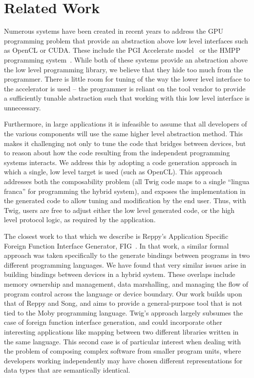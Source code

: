 
\section{Related Work}

Numerous systems have been created in recent years to address the GPU
programming problem that provide an abstraction above low level interfaces such
as OpenCL or CUDA. These include the PGI Accelerate model~\cite{pgi-accelerate}
or the HMPP programming system~\cite{hmpp}. While both of these systems provide
an abstraction above the low level programming library, we believe that they
hide too much from the programmer. There is little room for tuning of the way
the lower level interface to the accelerator is used -- the programmer is
reliant on the tool vendor to provide a sufficiently tunable abstraction such
that working with this low level interface is unnecessary.

Furthermore, in large applications it is infeasible to assume that all
developers of the various components will use the same higher level abstraction
method. This makes it challenging not only to tune the code that bridges between
devices, but to reason about how the code resulting from the independent
programming systems interacts. We address this by adopting a code generation
approach in which a single, low level target is used (such as OpenCL). This
approach addresses both the composability problem (all Twig code maps to a
single ``lingua franca'' for programming the hybrid system), and exposes the
implementation in the generated code to allow tuning and modification by the end
user. Thus, with Twig, users are free to adjust either the low level generated
code, or the high level protocol logic, as required by the application.

The closest work to that which we describe is Reppy's Application Specific
Foreign Function Interface Generator, FIG~\cite{reppy06fig}. In that work, a
similar formal approach was taken specifically to the generate bindings between
programs in two different programming languages. We have found that very similar
issues arise in building bindings between devices in a hybrid system. These
overlaps include memory ownership and management, data marshalling, and managing
the flow of program control across the language or device boundary. Our work
builds upon that of Reppy and Song, and aims to provide a general-purpose tool
that is not tied to the Moby programming language. Twig's approach largely
subsumes the case of foreign function interface generation, and could
incorporate other interesting applications like mapping between two different
libraries written in the same language. This second case is of particular
interest when dealing with the problem of composing complex software from
smaller program units, where developers working independently may have chosen
different representations for data types that are semantically identical.

